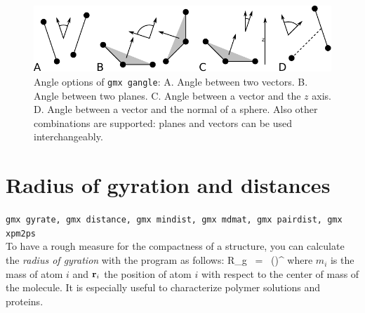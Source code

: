 \begin{figure}
\centerline{
{\includegraphics{plots/sgangle}}}
\caption[Angle options of {\tt gmx gangle}.]{Angle options of {\tt gmx gangle}:
A. Angle between two vectors.
B. Angle between two planes.
C. Angle between a vector and the $z$ axis.
D. Angle between a vector and the normal of a sphere.
Also other combinations are supported: planes and vectors can be used
interchangeably.}
\label{fig:sgangle}
\end{figure}


\section{Radius of gyration and distances}
\label{sec:rg}
{\tt gmx gyrate, gmx distance, gmx mindist, gmx mdmat, gmx pairdist, gmx xpm2ps}\\
To have a rough measure for the compactness of a structure, you can calculate 
the {\em radius of gyration} with the program {\tt {}} as follows:
\beq
R_g ~=~ \left({}\right)^{\half}
\label{eqn:rg}
\eeq
where $m_i$ is the mass of atom $i$ and ${\bf r}_i$ the position of 
atom $i$ with respect to the center of mass of the molecule. It is especially 
useful to characterize polymer solutions and proteins.

